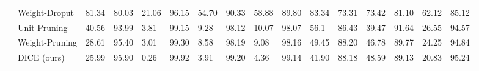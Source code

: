 \documentclass[runningheads]{llncs}
\begin{document}
\begin{sidewaystable}
{\begin{tabular}{llllllllllllllll}
 & Weight-Droput & 81.34 & 80.03 & 21.06 & 96.15 & 54.70 & 90.33 & 58.88 & 89.80 & 83.34 & 73.31 & 73.42 & 81.10 & 62.12 & 85.12 \\
 & Unit-Pruning & 40.56 & 93.99 & 3.81 & 99.15 & 9.28 & 98.12 & 10.07 & 98.07 & 56.1 & 86.43 & 39.47 & 91.64 & 26.55 & 94.57  \\
 & Weight-Pruning & 28.61 & 95.40 & 3.01 & 99.30 & 8.58 & 98.19 & 9.08 & 98.16 & 49.45 & 88.20 & 46.78 & 89.77 & 24.25 & 94.84 \\
 & {DICE} (ours) 
 & 25.99 & 95.90 & 0.26 & 99.92 & 3.91 & 99.20 & 4.36 & 99.14 & 41.90 & 88.18 & 48.59 & 89.13 & 20.83 & 95.24 
\\ \bottomrule
\end{tabular}}

\label{tab:detail-results-cifar10}
\end{sidewaystable}
\end{document}
